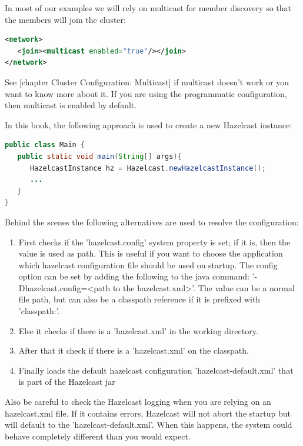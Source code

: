 In most of our examples we will rely on multicast for member discovery so that the members will join the cluster:
\begin{lstlisting}[language=xml]
<network>
   <join><multicast enabled="true"/></join>
</network>
\end{lstlisting}
See [chapter Cluster Configuration: Multicast] if multicast doesn't work or you want to know more about it. If you are using the programmatic configuration, then multicast is enabled by default.

In this book, the following approach is used to create a new Hazelcast instance:
\begin{lstlisting}[language=java]
public class Main {
   public static void main(String[] args){
      HazelcastInstance hz = Hazelcast.newHazelcastInstance();
      ...
   }
}
\end{lstlisting}
Behind the scenes the following alternatives are used to resolve the configuration:
\begin{enumerate}
\item First checks if the 'hazelcast.config' system property is set; if it is, then the value is used as path. This is useful if you want to choose the application which hazelcast configuration file should be used on startup. The config option can be set by adding the following to the java command: '-Dhazelcast.config=<path to the hazelcast.xml>'. The value can be a normal file path, but can also be a classpath reference if it is prefixed with 'classpath:'. 
\item Else it checks if there is a 'hazelcast.xml' in the working directory.
\item After that it check if there is a 'hazelcast.xml' on the classpath. 
\item Finally loads the default hazelcast configuration 'hazelcast-default.xml' that is part of the Hazelcast jar
\end{enumerate}
Also be careful to check the Hazelcast logging when you are relying on an hazelcast.xml file. If it contains errors, Hazelcast will not abort the startup but will default to the 'hazelcast-default.xml'. When this happens, the system could behave completely different than you would expect.

